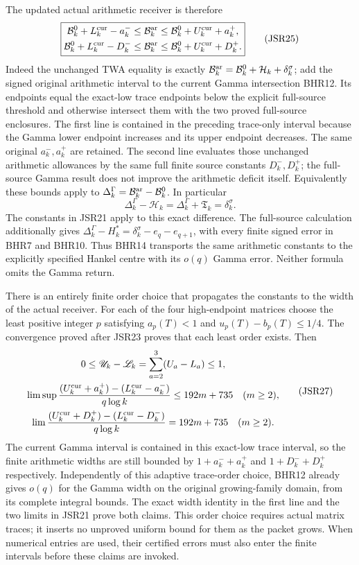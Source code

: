 \documentclass[11pt,a4paper]{article}
\begin{document}
The updated actual arithmetic receiver is therefore
\[
\boxed{\begin{aligned}
 \mathcal B_k^0+L_k^{\rm cur}-a_k^-
 &\leq\mathcal B_k^{\rm ar}
 \leq\mathcal B_k^0+U_k^{\rm cur}+a_k^+,\\
 \mathcal B_k^0+L_k^{\rm cur}-D_k^-
 &\leq\mathcal B_k^{\rm ar}
 \leq\mathcal B_k^0+U_k^{\rm cur}+D_k^+.
\end{aligned}}\tag{JSR25}
\]
Indeed the unchanged TWA equality is exactly
$\mathcal B_k^{\rm ar}=\mathcal B_k^0+
\mathcal H_k+\delta_k^\sigma$; add the signed original
arithmetic interval to the current Gamma intersection BHR12.
Its endpoints equal the exact-low trace endpoints below
the explicit full-source threshold and otherwise intersect
them with the two proved full-source enclosures.
The first line is contained in the preceding trace-only
interval because the Gamma lower endpoint increases and
its upper endpoint decreases. The same original
$a_k^-,a_k^+$ are retained. The second line evaluates
those unchanged arithmetic allowances by the same full
finite source constants $D_k^-,D_k^+$; the full-source
Gamma result does not improve the arithmetic deficit itself.
Equivalently these bounds apply to
$\Delta_k^\Gamma=\mathcal B_k^{\rm ar}-\mathcal B_k^0$.
In particular
\[
 \Delta_k^\Gamma-\mathcal H_k
 =\Delta_k^\Gamma+\mathfrak T_k=\delta_k^\sigma.
 \tag{JSR26}
\]
The constants in JSR21 apply to this exact difference.
The full-source calculation additionally gives
$\Delta_k^\Gamma-H_k^*=\delta_k^\sigma-e_q-e_{q+1}$,
with every finite signed error in BHR7 and BHR10.
Thus BHR14 transports the same arithmetic constants to
the explicitly specified Hankel centre with its $o(q)$
Gamma error. Neither formula omits the Gamma return.

There is an entirely finite order choice that propagates
the constants to the width of the actual receiver.
For each of the four high-endpoint matrices choose the least positive
integer $p$ satisfying $a_p(T)<1$ and
$u_p(T)-b_p(T)\leq1/4$. The convergence proved after
JSR23 proves that each least order exists. Then
\[
\begin{gathered}
 0\leq\mathscr U_k-\mathscr L_k
   =\sum_{a=2}^3(U_a-L_a)\leq1,\\
 \limsup\frac{
   (U_k^{\rm cur}+a_k^+)-(L_k^{\rm cur}-a_k^-)}{q\log k}
   \leq192m+735\quad(m\geq2),\\
 \lim\frac{
   (U_k^{\rm cur}+D_k^+)-(L_k^{\rm cur}-D_k^-)}{q\log k}
   =192m+735\quad(m\geq2).
\end{gathered}\tag{JSR27}
\]
The current Gamma interval is contained in this exact-low
trace interval, so the finite arithmetic widths are still
bounded by $1+a_k^-+a_k^+$ and $1+D_k^-+D_k^+$ respectively.
Independently of this adaptive trace-order choice, BHR12
already gives $o(q)$ for the Gamma width on the original
growing-family domain, from its complete integral bounds.
The exact width identity in the first line and the
two limits in JSR21 prove both claims. This order choice
requires actual matrix traces; it inserts no unproved
uniform bound for them as the packet grows. When numerical
entries are used, their certified errors must also enter
the finite intervals before these claims are invoked.
\end{document}
